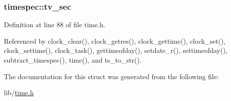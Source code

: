 \subsubsection[{\texorpdfstring{tv\+\_\+sec}{tv_sec}}]{ timespec\+::tv\+\_\+sec}\hypertarget{structtimespec_afc3302668d7cb5952f590da69fdd4955}{}\label{structtimespec_afc3302668d7cb5952f590da69fdd4955}


Definition at line 88 of file time.\+h.



Referenced by clock\+\_\+clear(), clock\+\_\+getres(), clock\+\_\+gettime(), clock\+\_\+set(), clock\+\_\+settime(), clock\+\_\+task(), gettimeofday(), setdate\+\_\+r(), settimeofday(), subtract\+\_\+timespec(), time(), and ts\+\_\+to\+\_\+str().



The documentation for this struct was generated from the following file\+:\begin{DoxyCompactItemize}
\item 
lib/\hyperlink{time_8h}{time.\+h}\end{DoxyCompactItemize}
